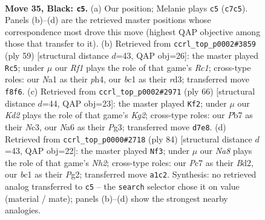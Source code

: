 \documentclass[11pt]{article}
\begin{document}
\clearpage

\begin{figure}[p]\centering
\begin{subfigure}{0.46\textwidth}\centering
\resizebox{\linewidth}{!}{%
\newchessgame
\chessboard[
  setfen={5r2/1ppkp2p/n5p1/p7/3N1P1P/2P5/P4PK1/n1B4R b - - 16 35},
  showmover=false,
  pgfstyle=straightmove, color=movearrow, markmove={c7-c5}
]}
\caption{}
\end{subfigure}\hfill
\begin{subfigure}{0.46\textwidth}\centering
\resizebox{\linewidth}{!}{%
\newchessgame
\chessboard[
  setfen={2r5/1p2kp2/5np1/p3p2p/7P/2PR4/PP3PP1/3BK3 b - - 2 30},
  showmover=false,
  pgfstyle=straightmove, color=movearrow, markmove={c8-c5}
]}
\caption{}
\end{subfigure}
\\[4pt]
\begin{subfigure}{0.46\textwidth}\centering
\resizebox{\linewidth}{!}{%
\newchessgame
\chessboard[
  setfen={8/1pp1r1kp/3p2p1/8/1nP2P2/1PN3PP/3R2K1/8 w - - 1 34},
  showmover=false,
  pgfstyle=straightmove, color=movearrow, markmove={g2-f2}
]}
\caption{}
\end{subfigure}\hfill
\begin{subfigure}{0.46\textwidth}\centering
\resizebox{\linewidth}{!}{%
\newchessgame
\chessboard[
  setfen={2nb3r/1R3p2/6k1/3pPp1p/2pP4/2P5/3B2PN/6K1 w - - 2 43},
  showmover=false,
  pgfstyle=straightmove, color=movearrow, markmove={h2-f3}
]}
\caption{}
\end{subfigure}
\caption{\textbf{Move 35, Black: \texttt{c5}.} (a) Our position; Melanie plays \texttt{c5} (\texttt{c7c5}). Panels (b)--(d) are the retrieved master positions whose correspondence most drove this move (highest QAP objective among those that transfer to it). (b) Retrieved from \texttt{ccrl\_top\_p0002\#3859} (ply 59) [structural distance $d$=43, QAP obj=26]: the master played \texttt{Rc5}; under $\mu$ our \emph{Rf1} plays the role of that game's \emph{Rc1}; cross-type roles: our \emph{N}a1 as their \emph{p}h4, our \emph{b}c1 as their \emph{r}d3; transferred move \texttt{f8f6}. (c) Retrieved from \texttt{ccrl\_top\_p0002\#2971} (ply 66) [structural distance $d$=44, QAP obj=23]: the master played \texttt{Kf2}; under $\mu$ our \emph{Kd2} plays the role of that game's \emph{Kg2}; cross-type roles: our \emph{P}b7 as their \emph{N}c3, our \emph{N}a6 as their \emph{P}g3; transferred move \texttt{d7e8}. (d) Retrieved from \texttt{ccrl\_top\_p0000\#2718} (ply 84) [structural distance $d$=43, QAP obj=22]: the master played \texttt{Nf3}; under $\mu$ our \emph{Na8} plays the role of that game's \emph{Nh2}; cross-type roles: our \emph{P}c7 as their \emph{B}d2, our \emph{b}c1 as their \emph{P}g2; transferred move \texttt{a1c2}. Synthesis: no retrieved analog transferred to \texttt{c5} -- the \texttt{search} selector chose it on value (material / mate); panels (b)--(d) show the strongest nearby analogies.}
\label{fig:thought-m69}
\end{figure}
\end{document}
